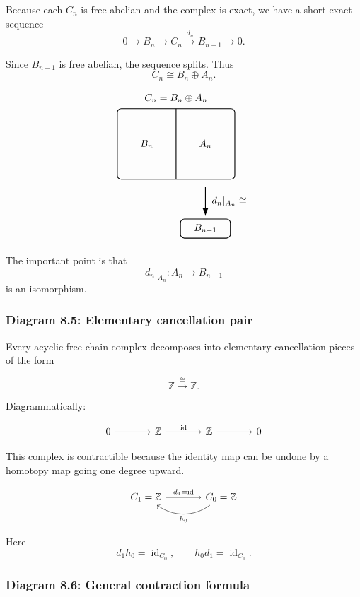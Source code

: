 \documentclass[12pt,a4paper]{article}
\theoremstyle{notespace}
\begin{document}
Because each \(C_n\) is free abelian and the complex is exact, we have a short exact sequence
\[
0\to B_n\to C_n\xrightarrow{d_n} B_{n-1}\to 0.
\]

Since \(B_{n-1}\) is free abelian, the sequence splits. Thus
\[
C_n\cong B_n\oplus A_n.
\]

\[
\begin{tikzpicture}[scale=1.05]
	\draw[thick, rounded corners] (-2,-1.2) rectangle (2,1.2);
	\draw[thick] (0,-1.2) -- (0,1.2);
	
	\node at (-1,0) {$B_n$};
	\node at (1,0) {$A_n$};
	\node at (0,1.55) {$C_n=B_n\oplus A_n$};
	
	\draw[-{Latex[length=3mm]}, thick] (1,-1.45) -- (1,-2.45);
	\node[right] at (1.1,-1.95) {$d_n|_{A_n}\cong$};
	
	\draw[thick, rounded corners] (0.15,-3.2) rectangle (1.85,-2.55);
	\node at (1,-2.875) {$B_{n-1}$};
\end{tikzpicture}
\]

The important point is that
\[
d_n|_{A_n}\colon A_n\to B_{n-1}
\]
is an isomorphism.

\subsubsection{Diagram 8.5: Elementary cancellation pair}

Every acyclic free chain complex decomposes into elementary cancellation pieces of the form

\[
\mathbb Z \xrightarrow{\cong} \mathbb Z.
\]

Diagrammatically:

\[
\begin{tikzcd}[column sep=large]
	0
	\arrow[r]
	&
	\mathbb Z
	\arrow[r,"\operatorname{id}"]
	&
	\mathbb Z
	\arrow[r]
	&
	0
\end{tikzcd}
\]

This complex is contractible because the identity map can be undone by a homotopy map going one degree upward.

\[
\begin{tikzcd}[column sep=large,row sep=large]
	C_1=\mathbb Z
	\arrow[r,"d_1=\operatorname{id}"]
	&
	C_0=\mathbb Z
	\arrow[l,bend left=35,"h_0"]
\end{tikzcd}
\]

Here
\[
d_1h_0=\operatorname{id}_{C_0},
\qquad
h_0d_1=\operatorname{id}_{C_1}.
\]

\subsubsection{Diagram 8.6: General contraction formula}
\end{document}

